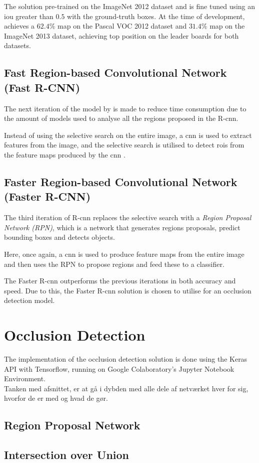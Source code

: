 The solution pre-trained on the ImageNet 2012 dataset and is fine tuned using an \gls{iou} greater than $0.5$ with the ground-truth boxes. At the time of development, \cite{Girshick2014} achieves a $62.4\%$ \gls{map} on the Pascal VOC 2012 dataset and $31.4\%$ \gls{map} on the ImageNet 2013 dataset, achieving top position on the leader boards for both datasets.

\subsection{Fast Region-based Convolutional Network (Fast R-CNN)}
The next iteration of the model by \cite{Girshick2015} is made to reduce time consumption due to the amount of models used to analyse all the regions proposed in the R-\gls{cnn}.

Instead of using the selective search on the entire image, a \gls{cnn} is used to extract features from the image, and the selective search is utilised to detect \gls{roi}s from the feature maps produced by the \gls{cnn} \citep{Girshick2015}.

\subsection{Faster Region-based Convolutional Network (Faster R-CNN)}
The third iteration of R-\gls{cnn} replaces the selective search with a \textit{Region Proposal Network (RPN)}, which is a network that generates regions proposals, predict bounding boxes and detects objects.

Here, once again, a \gls{cnn} is used to produce feature maps from the entire image and then uses the RPN to propose regions and feed these to a classifier.

The Faster R-\gls{cnn} outperforms the previous iterations in both accuracy and speed. Due to this, the Faster R-\gls{cnn} solution is chosen to utilise for an occlusion detection model.

\section{Occlusion Detection}
The implementation of the occlusion detection solution is done using the Keras API with Tensorflow, running on Google Colaboratory's Jupyter Notebook Environment.\\

Tanken med afsnittet, er at gå i dybden med alle dele af netværket hver for sig, hvorfor de er med og hvad de gør.

\subsection{Region Proposal Network}


\subsection{Intersection over Union}
